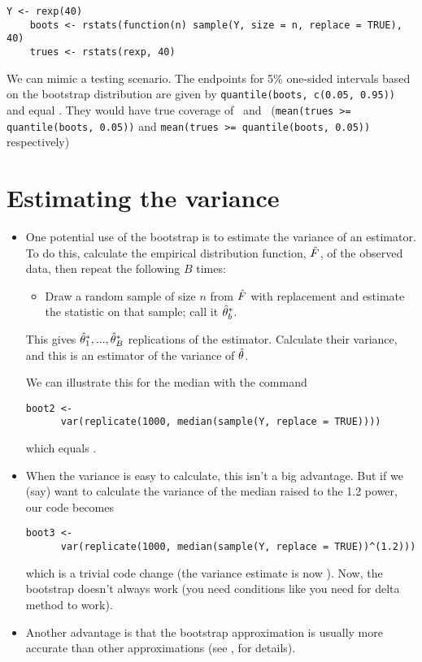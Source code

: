 \begin{itemize}
  \begin{lstlisting}[gobble=4]
    Y <- rexp(40)
    boots <- rstats(function(n) sample(Y, size = n, replace = TRUE), 40)
    trues <- rstats(rexp, 40)
  \end{lstlisting}

  We can mimic a testing scenario.  The endpoints for 5\% one-sided
  intervals based on the bootstrap distribution are given by
  \lstinline|quantile(boots, c(0.05, 0.95))| and equal \bootquantiles.
  They would have true coverage of \bootleft\ and \bootright\
  (\lstinline|mean(trues >= quantile(boots, 0.05))| and
  \lstinline|mean(trues >= quantile(boots, 0.05))| respectively)

\end{itemize}

\section{Estimating the variance}

\begin{itemize}

\item One potential use of the bootstrap is to estimate the variance
  of an estimator.  To do this, calculate the empirical distribution
  function, $\hat{F}$, of the observed data, then repeat the following $B$
  times:
  \begin{itemize}
  \item Draw a random sample of size $n$ from $\hat{F}$ with replacement
    and estimate the statistic on that sample; call it $\hat{\theta}^*_b$.
  \end{itemize}
  This gives $\hat{\theta}^*_1,...,\hat{\theta}^*_B$ replications of the estimator.
  Calculate their variance, and this is an estimator of the variance
  of $\hat{\theta}$.

  We can illustrate this for the median with the command
  \begin{lstlisting}[firstline=2,gobble=6]
    boot2 <-
      var(replicate(1000, median(sample(Y, replace = TRUE))))
  \end{lstlisting}
  which equals \medv.

\item When the variance is easy to calculate, this isn't a big
  advantage.  But if we (say) want to calculate the variance of the
  median raised to the 1.2 power, our code becomes
  \begin{lstlisting}[firstline=2,gobble=6]
    boot3 <-
      var(replicate(1000, median(sample(Y, replace = TRUE))^(1.2)))
  \end{lstlisting}
  which is a trivial code change (the variance estimate is now \powv).
  Now, the bootstrap doesn't always work (you need conditions like you
  need for delta method to work).

\item Another advantage is that the bootstrap approximation is usually
  more accurate than other approximations (see \citealp{Hal91}, for
  details).

\end{itemize}

